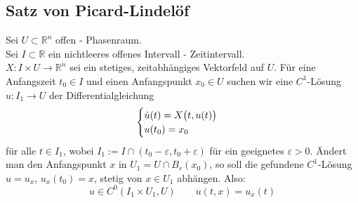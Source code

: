 \subsection{Satz von Picard-Lindelöf} %
\label{sub:23}
Sei $U \subset \mathds{R}^n$ offen - Phasenraum. \\
Sei $I \subset \mathds{R}$ ein nichtleeres offenes Intervall - Zeitintervall. \\
$X : I \times U \to \mathds{R}^n$ sei ein stetiges, zeitabhängiges Vektorfeld auf $U$. Für eine Anfangszeit $t_0 \in I$ und einen Anfangspunkt $x_0 \in U$ suchen wir eine
$C^1$-Lösung $u : I_1 \to U$ der Differentialgleichung
\[
	\begin{cases}
		\dot u (t) = X\enbrace[\big]{t, u(t)}\\
		u(t_0) = x_0
	\end{cases}
\]
für alle $t \in I_1$, wobei $I_1 := I \cap (t_0- \varepsilon, t_0 + \varepsilon)$ für ein geeignetes $\varepsilon >0$. Ändert man den Anfangspunkt $x$ in 
$U_1 = U \cap B_r(x_0)$, so soll die gefundene $C^1$-Lösung $u= u_x$, $u_x(t_0)=x$, stetig von $x \in U_1$ abhängen. Also:
\[
	u \in C^0(I_1 \times U_1, U) \qquad u(t,x)= u_x(t)
\]

